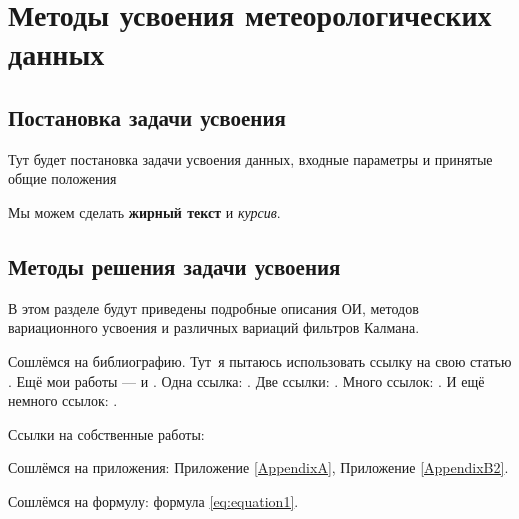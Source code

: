 \chapter{Методы усвоения метеорологических данных} \label{chapt1}

\section{Постановка задачи усвоения} \label{sect1_1}
Тут будет постановка задачи усвоения данных, входные параметры и принятые общие положения

Мы можем сделать \textbf{жирный текст} и \textit{курсив}.

\section{Методы решения задачи усвоения} \label{sect1_2}

В этом разделе будут приведены подробные описания ОИ, методов вариационного усвоения и различных вариаций фильтров Калмана.

Сошлёмся на библиографию. Тут~я пытаюсь использовать ссылку на свою статью \cite{vak-Mizyak-2013}. Ещё мои работы --- \cite{vak-Shlyaeva-2013} и \cite{Tolstykh-2015}. 
Одна ссылка: \cite[с.~54]{Ipatova-2013}\cite[с.~36]{WMO-CBS}. Две ссылки: \cite{Ipatova-2013,Tolstykh-SLAV}. Много ссылок:  \cite[с.~54]{Management,Borozda} \cite{Management,Borozda,Marketing,Constitution,FamilyCode,Gost.7.0.53,Razumovski,Lagkueva,Methodology,Encyclopedia,Kriger}. И ещё немного ссылок: \cite{Article,Book,Booklet,Conference,Inbook,Incollection,Manual,Mastersthesis,Misc,Phdthesis,Proceedings,Techreport,Unpublished}. \cite{medvedev2006jelektronnye, CEAT:CEAT581, doi:10.1080/01932691.2010.513279,Gosele1999161,Li2007StressAnalysis, Shoji199895,test:eisner-sample,AB_patent_Pomerantz_1968,iofis_patent1960}



Ссылки на собственные работы:~\cite{vak-Mizyak-2013, vak-Shlyaeva-2013}

Сошлёмся на приложения: Приложение \ref{AppendixA}, Приложение \ref{AppendixB2}.

Сошлёмся на формулу: формула \eqref{eq:equation1}.

